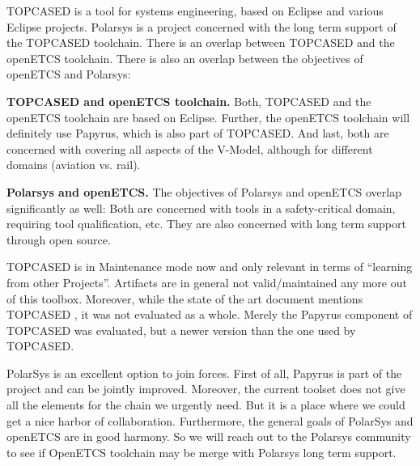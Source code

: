 TOPCASED is a tool for systems engineering, based on Eclipse and various Eclipse projects.  Polarsys is a project concerned with the long term support of the TOPCASED toolchain.  There is an overlap between TOPCASED and the openETCS toolchain.  There is also an overlap between the objectives of openETCS and Polarsys:

\textbf{TOPCASED and openETCS toolchain.} Both, TOPCASED and the openETCS toolchain are based on Eclipse.  Further, the openETCS toolchain will definitely use Papyrus, which is also part of TOPCASED.  And last, both are concerned with covering all aspects of the V-Model, although for different domains (aviation vs. rail).

\textbf{Polarsys and openETCS.}  The objectives of Polarsys and openETCS overlap significantly as well: Both are concerned with tools in a safety-critical domain, requiring tool qualification, etc.  They are also concerned with long term support through open source.


TOPCASED is in Maintenance mode now and only relevant in terms of
``learning from other Projects''. Artifacts are in general not
valid/maintained any more out of this toolbox. 
Moreover, while the state of the art document mentions TOPCASED \citep{D2_1},
 it was not evaluated as a whole.  Merely the Papyrus component of
 TOPCASED was evaluated, but a newer version than the one used by
 TOPCASED.



 PolarSys is an excellent option to join forces.  First of all,
 Papyrus is part of the project and can be jointly improved.
 Moreover, the current toolset does not give all the elements for the
 chain we urgently need. But it is a place where we could get 
 a nice harbor of collaboration. Furthermore,
 the general goals of PolarSys and openETCS are in good harmony. 
So we will reach out to the Polarsys
 community to see if  OpenETCS toolchain  may be merge with Polarsys
 long term support. 
 

